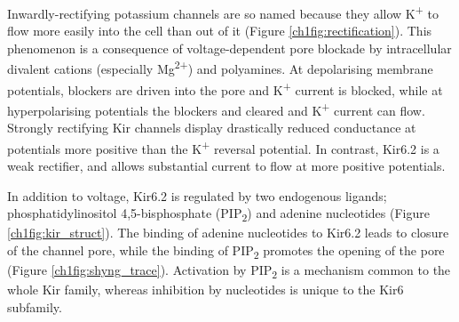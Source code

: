Inwardly-rectifying potassium channels are so named because they allow K\textsuperscript{+} to flow more easily into the cell than out of it (Figure \ref{ch1fig:rectification}).
This phenomenon is a consequence of voltage-dependent pore blockade by intracellular divalent cations (especially Mg\textsuperscript{2+}) and polyamines.
At depolarising membrane potentials, blockers are driven into the pore and K\textsuperscript{+} current is blocked, while at hyperpolarising potentials the blockers and cleared and K\textsuperscript{+} current can flow.
Strongly rectifying Kir channels display drastically reduced conductance at potentials more positive than the K\textsuperscript{+} reversal potential.
In contrast, Kir6.2 is a weak rectifier, and allows substantial current to flow at more positive potentials.

In addition to voltage, Kir6.2 is regulated by two endogenous ligands; 
phosphatidylinositol 4,5-bisphosphate (PIP\textsubscript{2}) and adenine nucleotides (Figure \ref{ch1fig:kir_struct}).
The binding of adenine nucleotides to Kir6.2 leads to closure of the channel pore, while the binding of PIP\textsubscript{2} promotes the opening of the pore (Figure \ref{ch1fig:shyng_trace}).
Activation by PIP\textsubscript{2} is a mechanism common to the whole Kir family, whereas inhibition by nucleotides is unique to the Kir6 subfamily.

